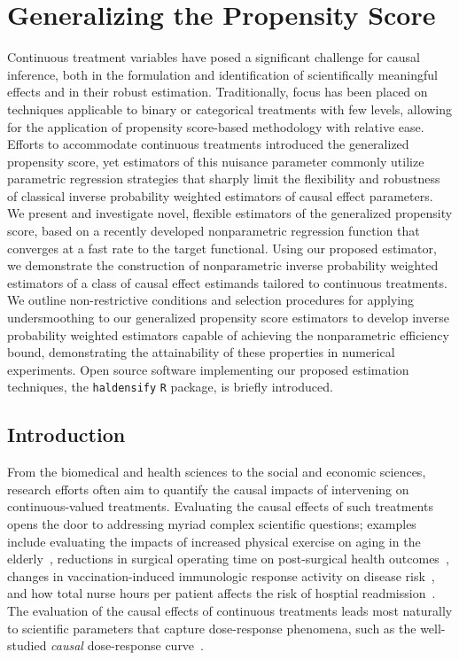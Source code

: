 \chapter{Generalizing the Propensity Score}\label{one}

Continuous treatment variables have posed a significant challenge for causal
inference, both in the formulation and identification of scientifically
meaningful effects and in their robust estimation. Traditionally, focus has been
placed on techniques applicable to binary or categorical treatments with few
levels, allowing for the application of propensity score-based methodology with
relative ease. Efforts to accommodate continuous treatments introduced the
generalized propensity score, yet estimators of this nuisance parameter commonly
utilize parametric regression strategies that sharply limit the flexibility and
robustness of classical inverse probability weighted estimators of causal effect
parameters. We present and investigate novel, flexible estimators of the
generalized propensity score, based on a recently developed nonparametric
regression function that converges at a fast rate to the target functional.
Using our proposed estimator, we demonstrate the construction of nonparametric
inverse probability weighted estimators of a class of causal effect estimands
tailored to continuous treatments. We outline non-restrictive conditions and
selection procedures for applying undersmoothing to our generalized propensity
score estimators to develop inverse probability weighted estimators capable of
achieving the nonparametric efficiency bound, demonstrating the attainability of
these properties in numerical experiments. Open source software
implementing our proposed estimation techniques, the \texttt{haldensify}
\texttt{R} package, is briefly introduced.

\section{Introduction}\label{intro}

From the biomedical and health sciences to the social and economic sciences,
research efforts often aim to quantify the causal impacts of intervening on
continuous-valued treatments. Evaluating the causal
effects of such treatments opens the door to addressing myriad complex
scientific questions; examples include evaluating the impacts of increased
physical exercise on aging in the elderly~\citep{diaz2012population}, reductions
in surgical operating time on post-surgical health
outcomes~\citep{haneuse2013estimation}, changes in vaccination-induced
immunologic response activity on disease risk~\citep{hejazi2020efficient}, and
how total nurse hours per patient affects the risk of hosptial
readmission~\citep{mchugh2013hospitals}. The evaluation of the causal effects of
continuous treatments leads most naturally to scientific parameters that
capture dose-response phenomena, such as the well-studied \textit{causal}
dose-response curve~\citep[e.g.,][]{imbens2000role,
diaz2013targeted,kennedy2017nonparametric}.

